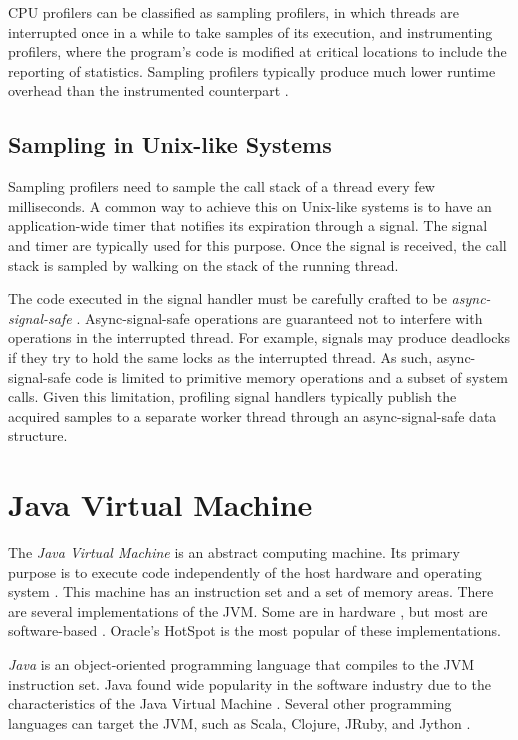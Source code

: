 CPU profilers can be classified as sampling profilers, in which threads are interrupted once in a while to take samples of its execution, and instrumenting profilers, where the program's code is modified at critical locations to include the reporting of statistics. Sampling profilers typically produce much lower runtime overhead than the instrumented counterpart \cite{moseley2007shadow}.

\subsection{Sampling in Unix-like Systems}

Sampling profilers need to sample the call stack of a thread every few milliseconds. A common way to achieve this on Unix-like systems is to have an application-wide timer that notifies its expiration through a signal. The  signal and  timer are typically used for this purpose. Once the signal is received, the call stack is sampled by walking on the stack of the running thread.

The code executed in the signal handler must be carefully crafted to be \emph{async-signal-safe} \cite{signalsafety}. Async-signal-safe operations are guaranteed not to interfere with operations in the interrupted thread. For example, signals may produce deadlocks if they try to hold the same locks as the interrupted thread. As such, async-signal-safe code is limited to primitive memory operations and a subset of system calls. Given this limitation, profiling signal handlers typically publish the acquired samples to a separate worker thread through an async-signal-safe data structure.


\section{Java Virtual Machine}

The \emph{Java Virtual Machine} is an abstract computing machine. Its primary purpose is to execute code independently of the host hardware and operating system \cite{jvmspec}\nocite{venners1998inside}. This machine has an instruction set and a set of memory areas. There are several implementations of the JVM. Some are in hardware \cite{picojava}, but most are software-based \cite{hotspot, j9, zing}. Oracle's HotSpot is the most popular of these implementations.

\emph{Java} is an object-oriented programming language that compiles to the JVM instruction set. Java found wide popularity in the software industry due to the characteristics of the Java Virtual Machine \cite{kumar2017survey}. Several other programming languages can target the JVM, such as Scala, Clojure, JRuby, and Jython \cite{li2013hosted}.

